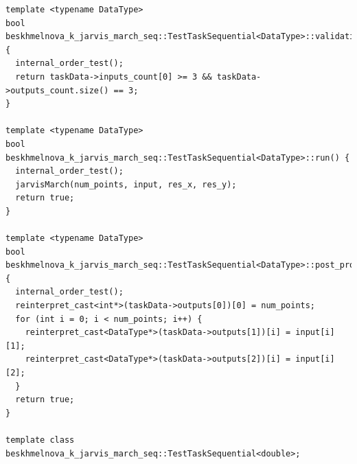 \documentclass[a4paper,12pt]{article}
\begin{document}
{\begin{lstlisting}
template <typename DataType>
bool beskhmelnova_k_jarvis_march_seq::TestTaskSequential<DataType>::validation() {
  internal_order_test();
  return taskData->inputs_count[0] >= 3 && taskData->outputs_count.size() == 3;
}

template <typename DataType>
bool beskhmelnova_k_jarvis_march_seq::TestTaskSequential<DataType>::run() {
  internal_order_test();
  jarvisMarch(num_points, input, res_x, res_y);
  return true;
}

template <typename DataType>
bool beskhmelnova_k_jarvis_march_seq::TestTaskSequential<DataType>::post_processing() {
  internal_order_test();
  reinterpret_cast<int*>(taskData->outputs[0])[0] = num_points;
  for (int i = 0; i < num_points; i++) {
    reinterpret_cast<DataType*>(taskData->outputs[1])[i] = input[i][1];
    reinterpret_cast<DataType*>(taskData->outputs[2])[i] = input[i][2];
  }
  return true;
}

template class beskhmelnova_k_jarvis_march_seq::TestTaskSequential<double>;
\end{lstlisting}
}
\end{document}
